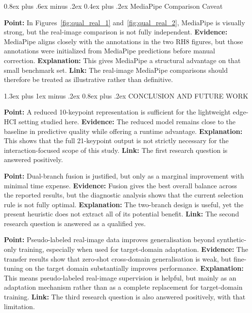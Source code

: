 \documentclass[10pt,letterpaper]{article}
\makeatletter
\renewcommand\section{\@startsection{section}{1}{\z@}%
  {1.3ex plus 1ex minus .2ex}%
  {0.8ex plus .2ex}%
  {\centering\normalfont\small\scshape}}
\renewcommand\subsubsection{\@startsection{subsubsection}{3}{\z@}%
  {0.8ex plus .6ex minus .2ex}%
  {0.4ex plus .2ex}%
  {\normalfont\small\itshape}}
\makeatother
\begin{document}
\subsubsection{MediaPipe Comparison Caveat}

\medskip
\noindent\textbf{Point:} In Figures~\ref{fig:qual_real_1} and~\ref{fig:qual_real_2}, MediaPipe is visually strong, but the real-image comparison is not fully independent.
\textbf{Evidence:} MediaPipe aligns closely with the annotations in the two RH8 figures, but those annotations were initialized from MediaPipe predictions before manual correction.  
\textbf{Explanation:} This gives MediaPipe a structural advantage on that small benchmark set.  
\textbf{Link:} The real-image MediaPipe comparisons should therefore be treated as illustrative rather than definitive.

\section{CONCLUSION AND FUTURE WORK}

\noindent\textbf{Point:} A reduced 10-keypoint representation is sufficient for the lightweight edge-HCI setting studied here.
\textbf{Evidence:} The reduced model remains close to the baseline in predictive quality while offering a runtime advantage.
\textbf{Explanation:} This shows that the full 21-keypoint output is not strictly necessary for the interaction-focused scope of this study.
\textbf{Link:} The first research question is answered positively.

\medskip
\noindent\textbf{Point:} Dual-branch fusion is justified, but only as a marginal improvement with minimal time expense.
\textbf{Evidence:} Fusion gives the best overall balance across the reported results, but the diagnostic analysis shows that the current selection rule is not fully optimal.
\textbf{Explanation:} The two-branch design is useful, yet the present heuristic does not extract all of its potential benefit.
\textbf{Link:} The second research question is answered as a qualified yes.

\medskip
\noindent\textbf{Point:} Pseudo-labeled real-image data improves generalisation beyond synthetic-only training, especially when used for target-domain adaptation.
\textbf{Evidence:} The transfer results show that zero-shot cross-domain generalisation is weak, but fine-tuning on the target domain substantially improves performance.
\textbf{Explanation:} This means pseudo-labeled real-image supervision is helpful, but mainly as an adaptation mechanism rather than as a complete replacement for target-domain training.
\textbf{Link:} The third research question is also answered positively, with that limitation.
\end{document}
